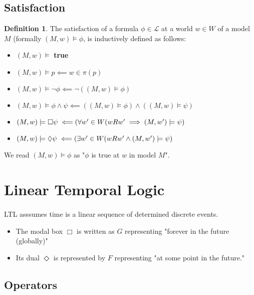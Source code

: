 \documentclass{article}
\theoremstyle{plain}
\theoremstyle{definition}
\newtheorem{defn}[thm]{Definition} %
\begin{document}
\begin{multicols}{2}
\subsection{Satisfaction}

\begin{defn}The satisfaction of a formula $\phi\in\mathcal{L}$ at a world $w\in W$ of a model $M$ (formally $(M, w) \models \phi$, is inductively defined as follows:\end{defn}

\begin{itemize}
\item $(M, w) \models $ \textbf{true}
\item $(M, w) \models p \impliedby w \in \pi(p)$
\item $(M, w) \models \lnot\phi \impliedby \lnot((M, w)\models \phi)$
\item $(M, w) \models \phi \land \psi \impliedby ((M,w) \models \phi) \land ((M, w) \models \psi)$
\item $(M, w) \models \Box\psi \impliedby\\ (\forall w' \in W (w R w' \implies (M, w') \models \psi)$
\item $(M, w) \models \Diamond\psi \impliedby\\ (\exists w' \in W (w R w' \land (M, w') \models \psi)$
\end{itemize}

\noindent We read $(M, w) \models \phi$ as "$\phi$ is true at $w$ in model $M$".

\section{Linear Temporal Logic}

\paragraph{} LTL asssumes time is a linear sequence of determined discrete events. 

\begin{itemize}
\item The modal box $\Box$ is written as $G$ representing "forever in the future (globally)"
\item Its dual $\Diamond$ is represented by $F$ representing "at some point in the future."
\end{itemize}

\subsection{Operators}


\end{multicols}
\end{document}

